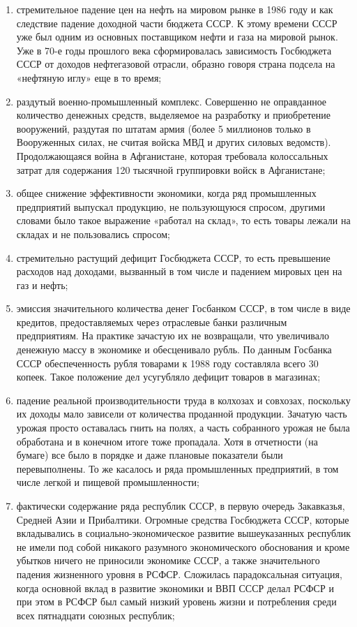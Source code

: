 \documentclass{article}
\begin{document}
\begin{enumerate}
    \item стремительное падение цен на нефть на мировом рынке в 1986 году и как следствие падение доходной части бюджета СССР. К этому времени СССР уже был одним из основных поставщиком нефти и газа на мировой рынок. Уже в 70-е годы прошлого века сформировалась зависимость Госбюджета СССР от доходов нефтегазовой отрасли, образно говоря страна подсела на «нефтяную иглу» еще в то время;
    \item раздутый военно-промышленный комплекс. Совершенно не оправданное количество денежных средств, выделяемое на разработку и приобретение вооружений, раздутая по штатам армия (более 5 миллионов только в Вооруженных силах, не считая войска МВД и других силовых ведомств). Продолжающаяся война в Афганистане, которая требовала колоссальных затрат для содержания 120 тысячной группировки войск в Афганистане;
    \item общее снижение эффективности экономики, когда ряд промышленных предприятий выпускал продукцию, не пользующуюся спросом, другими словами было такое выражение «работал на склад», то есть товары лежали на складах и не пользовались спросом;
    \item стремительно растущий дефицит Госбюджета СССР, то есть превышение расходов над доходами, вызванный в том числе и падением мировых цен на газ и нефть;
    \item эмиссия значительного количества денег Госбанком СССР, в том числе в виде кредитов, предоставляемых через отраслевые банки различным предприятиям. На практике зачастую их не возвращали, что увеличивало денежную массу в экономике и обесценивало рубль. По данным Госбанка СССР обеспеченность рубля товарами к 1988 году составляла всего 30 копеек. Такое положение дел усугубляло дефицит товаров в магазинах;
    \item падение реальной производительности труда в колхозах и совхозах, поскольку их доходы мало зависели от количества проданной продукции. Зачатую часть урожая просто оставалась гнить на полях, а часть собранного урожая не была обработана и в конечном итоге тоже пропадала. Хотя в отчетности (на бумаге) все было в порядке и даже плановые показатели были перевыполнены. То же касалось и ряда промышленных предприятий, в том числе легкой и пищевой промышленности;
    \item фактически содержание ряда республик СССР, в первую очередь Закавказья, Средней Азии и Прибалтики. Огромные средства Госбюджета СССР, которые вкладывались в социально-экономическое развитие вышеуказанных республик не имели под собой никакого разумного экономического обоснования и кроме убытков ничего не приносили экономике СССР, а также значительного падения жизненного уровня в РСФСР. Сложилась парадоксальная ситуация, когда основной вклад в развитие экономики и ВВП СССР делал РСФСР и при этом в РСФСР был самый низкий уровень жизни и потребления среди всех пятнадцати союзных республик;

\end{enumerate}
\end{document}
